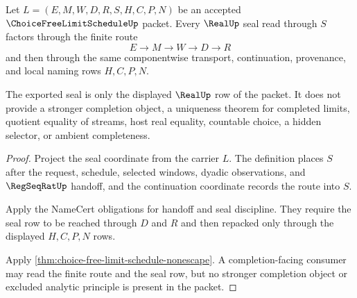 \begin{theorem}
\label{thm:choice-free-limit-schedule-real-seal-discipline}
Let $L=(E,M,W,D,R,S,H,C,P,N)$ be an accepted $\ChoiceFreeLimitScheduleUp$ packet. Every $\RealUp$ seal read through $S$ factors through the finite route
$$
E \to M \to W \to D \to R
$$
and then through the same componentwise transport, continuation, provenance, and local naming rows $H,C,P,N$.

The exported seal is only the displayed $\RealUp$ row of the packet. It does not provide a stronger completion object, a uniqueness theorem for completed limits, quotient equality of streams, host real equality, countable choice, a hidden selector, or ambient completeness.
\end{theorem}
\begin{proof}
Project the seal coordinate from the carrier $L$. The definition places $S$ after the request, schedule, selected windows, dyadic observations, and $\RegSeqRatUp$ handoff, and the continuation coordinate records the route into $S$.

Apply the NameCert obligations for handoff and seal discipline. They require the seal row to be reached through $D$ and $R$ and then repacked only through the displayed $H,C,P,N$ rows.

Apply \autoref{thm:choice-free-limit-schedule-nonescape}. A completion-facing consumer may read the finite route and the seal row, but no stronger completion object or excluded analytic principle is present in the packet.
\end{proof}

